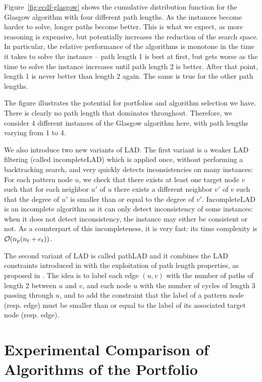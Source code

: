 \documentclass{llncs}
\begin{document}
Figure~\ref{fig:ecdf-glasgow} shows the cumulative distribution function for the
Glasgow algorithm with four different path lengths. As the instances become
harder to solve, longer paths become better. This is what we expect, as more
reasoning is expensive, but potentially increases the reduction of the search
space. In particular, the relative performance of the algorithms is monotone in
the time it takes to solve the instance -- path length 1 is best at first, but
gets worse as the time to solve the instance increases until path length 2 is
better. After that point, length 1 is never better than length 2 again. The same
is true for the other path lengths.

The figure illustrates the potential for portfolios and algorithm selection we
have. There is clearly no path length that dominates throughout. Therefore, we
consider 4 different instances of the Glasgow algorithm here, with path lengths
varying from 1 to 4.


We also introduce two new variants of LAD. The first variant is a weaker LAD filtering (called incompleteLAD) which is applied once, without performing a backtracking search, and very quickly detects inconsistencies on many instances: For each pattern node $u$, we check that there exists at least one target node $v$ such that for each neighbor $u'$ of $u$ there exists a different neighbor $v'$ of $v$ such that the degree of $u'$ is smaller than or equal to the degree of $v'$. IncompleteLAD is an incomplete algorithm as it can only detect inconsistency of some instances: when it does not detect inconsistency, the instance may either be consistent or not. As a counterpart of this incompleteness, it is very fast: its time complexity is ${\cal O}(n_p(n_t+e_t))$.

The second variant of LAD is called pathLAD and it combines the LAD constraints introduced in \cite{Solnon:2010} with the exploitation of path length properties, as proposed in \cite{Audemard:2014}. The idea is to label each edge $(u,v)$ with the number of paths of length 2 between $u$ and $v$, and each node $u$ with the number of cycles of length 3 passing through $u$, and to add the constraint that the label of a pattern node (resp. edge) must be smaller than or equal to the label of its associated target node (resp. edge). 

\section{Experimental Comparison of Algorithms of the Portfolio}\label{expComp}
\end{document}
